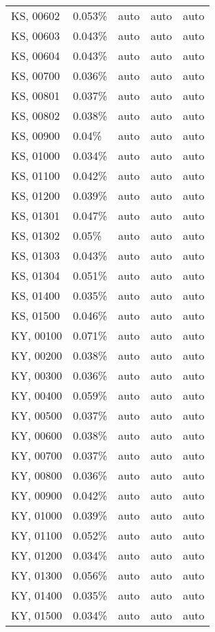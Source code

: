 \begin{longtable}[]{@{}lllll@{}}
KS, 00602 & 0.053\% & auto & auto & auto \\
KS, 00603 & 0.043\% & auto & auto & auto \\
KS, 00604 & 0.043\% & auto & auto & auto \\
KS, 00700 & 0.036\% & auto & auto & auto \\
KS, 00801 & 0.037\% & auto & auto & auto \\
KS, 00802 & 0.038\% & auto & auto & auto \\
KS, 00900 & 0.04\% & auto & auto & auto \\
KS, 01000 & 0.034\% & auto & auto & auto \\
KS, 01100 & 0.042\% & auto & auto & auto \\
KS, 01200 & 0.039\% & auto & auto & auto \\
KS, 01301 & 0.047\% & auto & auto & auto \\
KS, 01302 & 0.05\% & auto & auto & auto \\
KS, 01303 & 0.043\% & auto & auto & auto \\
KS, 01304 & 0.051\% & auto & auto & auto \\
KS, 01400 & 0.035\% & auto & auto & auto \\
KS, 01500 & 0.046\% & auto & auto & auto \\
KY, 00100 & 0.071\% & auto & auto & auto \\
KY, 00200 & 0.038\% & auto & auto & auto \\
KY, 00300 & 0.036\% & auto & auto & auto \\
KY, 00400 & 0.059\% & auto & auto & auto \\
KY, 00500 & 0.037\% & auto & auto & auto \\
KY, 00600 & 0.038\% & auto & auto & auto \\
KY, 00700 & 0.037\% & auto & auto & auto \\
KY, 00800 & 0.036\% & auto & auto & auto \\
KY, 00900 & 0.042\% & auto & auto & auto \\
KY, 01000 & 0.039\% & auto & auto & auto \\
KY, 01100 & 0.052\% & auto & auto & auto \\
KY, 01200 & 0.034\% & auto & auto & auto \\
KY, 01300 & 0.056\% & auto & auto & auto \\
KY, 01400 & 0.035\% & auto & auto & auto \\
KY, 01500 & 0.034\% & auto & auto & auto \\

\end{longtable}
